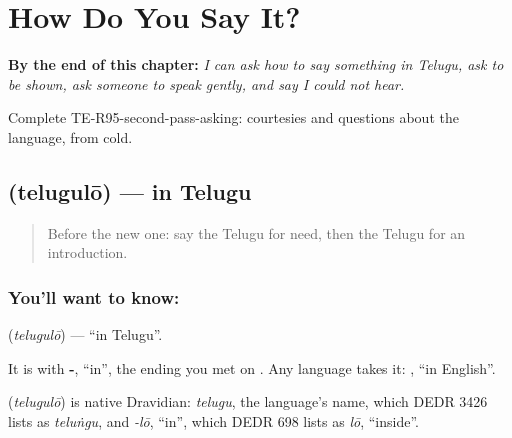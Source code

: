 
\chapter{How Do You Say It?}
\label{ch:te-how-do-you-say-it}

\begin{chapteropening}
\textbf{By the end of this chapter:} \emph{I can ask how to say something in Telugu, ask to be shown, ask someone to speak gently, and say I could not hear.}

Complete TE-R95-second-pass-asking: courtesies and questions about the language, from cold.
\end{chapteropening}

\section[\texorpdfstring{\te{తెలుగులో} (telugulō)}{తెలుగులో (telugulō)}]{ (telugulō) — in Telugu}

\label{lesson:TE-C95-intelugu}



\begin{quote}
Before the new one: say the Telugu for need, then the Telugu for an introduction.
\end{quote}

\subsection*{You'll want to know: }
\textbf{} (\emph{telugulō}) — \textquotedblleft{}in Telugu\textquotedblright{}.

It is \textbf{} with \textbf{-}, \textquotedblleft{}in\textquotedblright{}, the ending you met on \textbf{}. Any language takes it: \textbf{}, \textquotedblleft{}in English\textquotedblright{}.

\begin{cousinweb}
\textbf{} (\emph{telugulō}) is native Dravidian: \emph{telugu}, the language's name, which DEDR 3426 lists as \emph{teluṅgu}, and \emph{-lō}, \textquotedblleft{}in\textquotedblright{}, which DEDR 698 lists as \emph{lō}, \textquotedblleft{}inside\textquotedblright{}.
\end{cousinweb}

